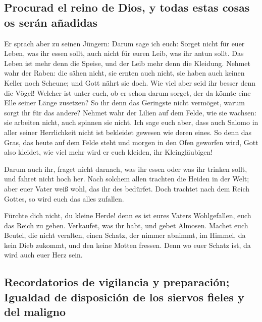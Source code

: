 \hypertarget{procurad-el-reino-de-dios-y-todas-estas-cosas-os-seruxe1n-auxf1adidas}{%
\subsection{Procurad el reino de Dios, y todas estas cosas os serán
añadidas}\label{procurad-el-reino-de-dios-y-todas-estas-cosas-os-seruxe1n-auxf1adidas}}

 Er sprach aber zu seinen Jüngern: Darum sage ich euch:
Sorget nicht für euer Leben, was ihr essen sollt, auch nicht für euren
Leib, was ihr antun sollt.  Das Leben ist mehr denn die
Speise, und der Leib mehr denn die Kleidung.  Nehmet wahr
der Raben: die sähen nicht, sie ernten auch nicht, sie haben auch keinen
Keller noch Scheune; und Gott nährt sie doch. Wie viel aber seid ihr
besser denn die Vögel!  Welcher ist unter euch, ob er
schon darum sorget, der da könnte eine Elle seiner Länge zusetzen?
 So ihr denn das Geringste nicht vermöget, warum sorgt
ihr für das andere?  Nehmet wahr der Lilien auf dem
Felde, wie sie wachsen: sie arbeiten nicht, auch spinnen sie nicht. Ich
sage euch aber, dass auch Salomo in aller seiner Herrlichkeit nicht ist
bekleidet gewesen wie deren eines.  So denn das Gras, das
heute auf dem Felde steht und morgen in den Ofen geworfen wird, Gott
also kleidet, wie viel mehr wird er euch kleiden, ihr Kleingläubigen!

 Darum auch ihr, fraget nicht darnach, was ihr essen oder
was ihr trinken sollt, und fahret nicht hoch her.  Nach
solchem allen trachten die Heiden in der Welt; aber euer Vater weiß
wohl, das ihr des bedürfet.  Doch trachtet nach dem Reich
Gottes, so wird euch das alles zufallen.

 Fürchte dich nicht, du kleine Herde! denn es ist eures
Vaters Wohlgefallen, euch das Reich zu geben.  Verkaufet,
was ihr habt, und gebet Almosen. Machet euch Beutel, die nicht veralten,
einen Schatz, der nimmer abnimmt, im Himmel, da kein Dieb zukommt, und
den keine Motten fressen.  Denn wo euer Schatz ist, da
wird auch euer Herz sein.

\hypertarget{recordatorios-de-vigilancia-y-preparaciuxf3n-igualdad-de-disposiciuxf3n-de-los-siervos-fieles-y-del-maligno}{%
\subsection{Recordatorios de vigilancia y preparación; Igualdad de
disposición de los siervos fieles y del
maligno}\label{recordatorios-de-vigilancia-y-preparaciuxf3n-igualdad-de-disposiciuxf3n-de-los-siervos-fieles-y-del-maligno}}

